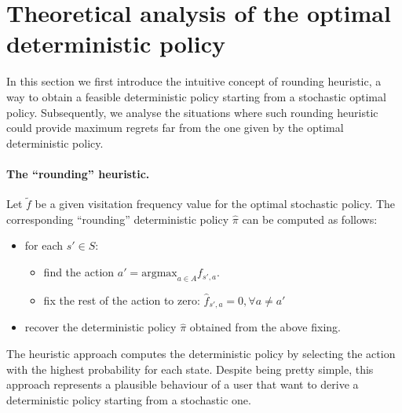 \section{Theoretical analysis of the optimal deterministic policy}\label{sec:comparison}

%

In this section we first introduce the intuitive concept of rounding heuristic, a way to obtain a feasible deterministic policy starting from a stochastic optimal policy. Subsequently, we analyse the situations where such rounding heuristic could provide maximum regrets far from the one given by the optimal deterministic policy.

\paragraph{\textbf{The ``rounding'' heuristic.}}%

Let $\tilde{f}$ be a given visitation frequency value for the optimal stochastic policy. The corresponding ``rounding'' deterministic policy $\hat{\pi}$ can be computed as follows:

\begin{itemize}
\item for each $s'\in S$:
\begin{itemize}
\item find the action $a' = \text{argmax}_{a \in A}f_{s',a}$.
\item fix the rest of the action to zero: $\hat{f}_{s',a} =0, \forall a \neq a'$
\end{itemize}
\item recover the deterministic policy $\hat{\pi}$ obtained from the above fixing.
\end{itemize} 
 
The heuristic approach computes the deterministic policy by selecting the action with the highest probability for each state. Despite being pretty simple, this approach represents a plausible behaviour of a user that want to derive a deterministic policy starting from a stochastic one. 
%
%
%
%
%

